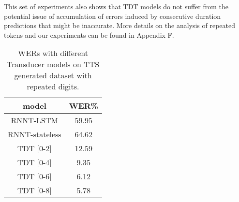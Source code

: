 \documentclass{article}
\begin{document}
This set of experiments also shows that TDT models do not suffer from the potential issue of accumulation of errors induced by consecutive duration predictions that might be inaccurate.
More details on the analysis of repeated tokens and our experiments can be found in Appendix F. 

\begin{table}[]
    \centering
    \begin{tabular}{c c}
    \toprule
        model & WER\%\\
    \midrule
        RNNT-LSTM & 59.95 \\
        RNNT-stateless & 64.62 \\
        TDT [0-2] & 12.59 \\
        TDT [0-4] & 9.35 \\
        TDT [0-6] & 6.12 \\
        TDT [0-8] & 5.78 \\
    \bottomrule
    \end{tabular}
    \caption{WERs with different Transducer models on TTS generated dataset with repeated digits.}
    \label{repeated_wer}
\end{table}
\end{document}
